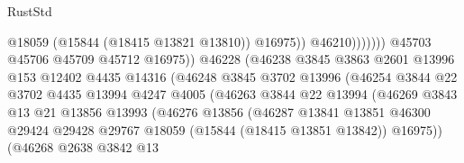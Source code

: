\begin{lexlean}{RustStd}
\begin{coremodule}
                                                    @18059
                                                    (@15844 (@18415 @13821 @13810))
                                                    @16975))
                                                @46210)))))))
                                  @45703
                                  @45706
                                  @45709
                                  @45712
                                  @16975))
                              @46228
                              (@46238
                                @3845
                                @3863
                                @2601
                                @13996
                                @153
                                @12402
                                @4435
                                @14316
                                (@46248
                                  @3845
                                  @3702
                                  @13996
                                  (@46254
                                    @3844
                                    @22
                                    @3702
                                    @4435
                                    @13994
                                    @4247
                                    @4005
                                    (@46263
                                      @3844
                                      @22
                                      @13994
                                      (@46269
                                        @3843
                                        @13
                                        @21
                                        @13856
                                        @13993
                                        (@46276
                                          @13856
                                          (@46287
                                            @13841
                                            @13851
                                            @46300
                                            @29424
                                            @29428
                                            @29767
                                            @18059
                                            (@15844 (@18415 @13851 @13842))
                                            @16975))
                                        (@46268
                                          @2638
                                          @3842
                                          @13

\end{coremodule}
\end{lexlean}
